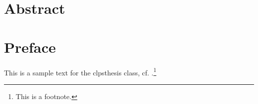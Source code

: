 \documentclass[11pt,final]{clpsthesis}
\begin{document}
\thesistitlepage

\dedication[to]{Someone important}

\frontmatter

\chapter{Abstract}
\newpage

\tableofcontents

\chapter{Preface}

This is a sample text for the \textsf{clpsthesis} class, cf. \cite{Author2020}.\footnote{This is a footnote.}

\mainmatter

\blinddocument

\backmatter

\printbibliography
\end{document}
